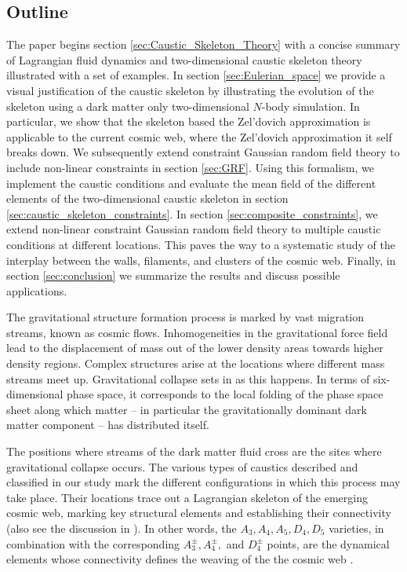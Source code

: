 \documentclass[a4paper, 11pt]{article}
\begin{document}
\subsection{Outline}
The paper begins section \ref{sec:Caustic_Skeleton_Theory} with a
concise summary of Lagrangian fluid dynamics and two-dimensional caustic
skeleton theory illustrated with a set of examples. In section
\ref{sec:Eulerian_space} we provide a visual justification of the
caustic skeleton by illustrating the evolution of the skeleton using a
dark matter only two-dimensional $N$-body simulation. In particular, we
show that the skeleton based the Zel'dovich approximation is applicable
to the current cosmic web, where the Zel'dovich approximation it self
breaks down. We subsequently extend constraint Gaussian random field
theory to include non-linear constraints in section \ref{sec:GRF}. Using
this formalism, we implement the caustic conditions and evaluate the
mean field of the different elements of the two-dimensional caustic
skeleton in section \ref{sec:caustic_skeleton_constraints}. In section
\ref{sec:composite_constraints}, we extend non-linear constraint
Gaussian random field theory to multiple caustic conditions at different
locations. This paves the way to a systematic study of the interplay
between the walls, filaments, and clusters of the cosmic web. Finally,
in section \ref{sec:conclusion} we summarize the results and discuss
possible applications.




\noindent

The gravitational structure formation process is marked by vast
migration streams, known as cosmic flows. Inhomogeneities in
the gravitational force field lead to the displacement of mass out of
the lower density areas towards higher density regions.
Complex structures arise at the locations where different mass streams
meet up. Gravitational collapse sets in as this happens.
In terms of six-dimensional phase space, it corresponds to the local
folding of the phase space sheet along which matter -- in particular
the gravitationally dominant dark matter component -- has distributed
itself.

The positions where streams of the dark matter fluid cross are the sites
where gravitational collapse occurs. The various types of
caustics described and classified in our study mark the different
configurations in which this process may take place. Their locations
trace out a Lagrangian skeleton of the emerging cosmic web, marking key
structural elements and establishing their connectivity
(also see the discussion in \cite{Hidding:2014}). In other words, the
$A_3,A_4,A_5,D_4,D_5$ varieties, in combination with the
corresponding $A_3^\pm, A_4^\pm,$ and $D_4^\pm$ points, are the
dynamical elements whose connectivity defines the weaving of the
the cosmic web
\citep{Zeldovich:1970,bondweb1996,weybond2008,aragon2010,cautun2014}.
\end{document}
